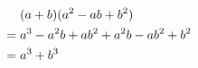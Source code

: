 \begin{align}
    & (a+b)(a^2-ab+b^2) \notag \\
={} & a^3 - a^2b + ab^2 + a^2b
      - ab^2 + b^2 \notag \\
={} & a^3 + b^3 \label{eq:cubesum}
\end{align}

